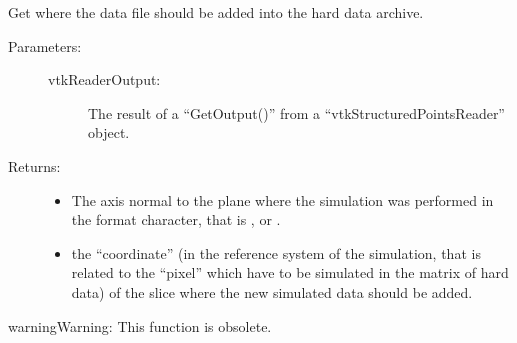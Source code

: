 \documentclass[letterpaper,10pt,english]{sphinxmanual}
\begin{document}
\begin{fulllineitems}
\label{\detokenize{appendices:s2Dcd.s2Dcd.GetWhereToAddData}}
Get where the data file should be added into the hard data
archive.
\begin{description}
\item[{Parameters:}] \leavevmode\begin{description}
\item[{vtkReaderOutput:}] \leavevmode
The result of a “GetOutput()” from a
“vtkStructuredPointsReader” object.

\end{description}

\item[{Returns:}] \leavevmode\begin{itemize}
\item {} 
The axis normal to the plane where the simulation was
performed in the format character, that is ,  or .

\item {} 
the “coordinate” (in the reference system of the simulation,
that is related to the “pixel” which have to be simulated in
the matrix of hard data) of the slice where the new
simulated data should be added.

\end{itemize}

\end{description}

\begin{sphinxadmonition}{warning}{Warning:}
This function is obsolete.
\end{sphinxadmonition}

\end{fulllineitems}

\end{document}
